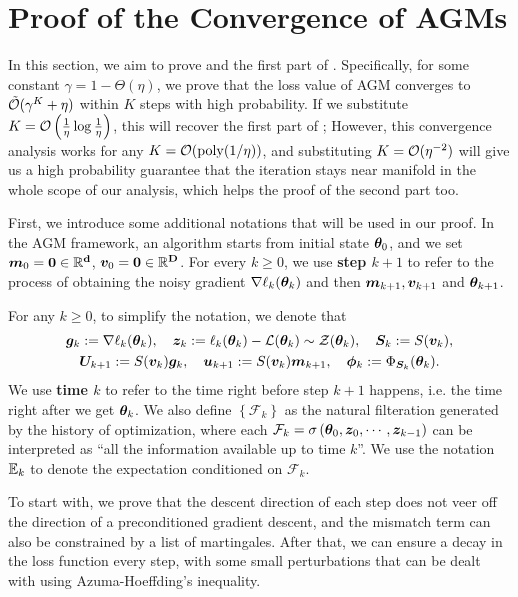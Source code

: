 
\section{Proof of the Convergence of AGMs}\label{app:proof-convergence}


In this section, we aim to prove  and the first part of . Specifically, for some constant $\gamma = 1 - \Theta(\eta)$, we prove that the loss value of AGM converges to $\tilde{\mathcal{O}}(\gamma^K + \eta)$ within $K$ steps with high probability. If we substitute $K = \mathcal{O}\left(\frac{1}{\eta}\log \frac{1}{\eta}\right)$, this will recover the first part of ; However, this convergence analysis works for any $K = \mathcal{O}(\mathrm{poly}(1/\eta))$, and substituting $K = \mathcal{O}(\eta^{-2})$ will give us a high probability guarantee that the iteration stays near manifold in the whole scope of our analysis, which helps the proof of the second part too.

First, we introduce some additional notations that will be used in our proof. In the AGM framework, an algorithm starts from initial state ${\bm{\theta}}_0$, and we set ${\bm{m}}_0 = \bf{0} \in \mathbb{R}^d$, ${\bm{v}}_0 = \bf{0} \in \mathbb{R}^D$. For every $k \geq 0$, we use \textbf{step $k+1$} to refer to the process of obtaining the noisy gradient $\nabla \ell_k({\bm{\theta}}_{k})$ and then ${\bm{m}}_{k+1}, {\bm{v}}_{k+1}$ and ${\bm{\theta}}_{k+1}$. 

For any $k \geq 0$, to simplify the notation, we denote that
\begin{gather*}
    {\bm{g}}_{k} := \nabla \ell_k({\bm{\theta}}_{k}), \quad
    {\bm{z}}_{k} := \ell_k({\bm{\theta}}_{k}) - \mathcal{L}({\bm{\theta}}_k) \sim \mathcal{Z}({\bm{\theta}}_k), \quad {\bm{S}}_k :=S({\bm{v}}_{k}),\\
    {\bm{U}}_{k+1} := S({\bm{v}}_{k}) {\bm{g}}_{k}, \quad
    {\bm{u}}_{k+1} := S({\bm{v}}_{k}) {\bm{m}}_{k+1},\quad {\bm{\phi}}_k:= \Phi_{{\bm{S}}_k}({\bm{\theta}}_k).
\end{gather*} 
We use \textbf{time $k$} to refer to the time right before step $k + 1$ happens, i.e. the time right after we get ${\bm{\theta}}_k$. We also define $\left\{\mathcal{F}_k\right\}$ as the natural filteration generated by the history of optimization, where each $\mathcal{F}_k = \sigma\left({\bm{\theta}}_0, {\bm{z}}_0, \cdots, {\bm{z}}_{k-1}\right)$ can be interpreted as ``all the information available up to time $k$''. We use the notation \textbf{$\mathbb{E}_k$} to denote the expectation conditioned on $\mathcal{F}_k$. 

To start with, we prove that the descent direction of each step does not veer off the direction of a preconditioned gradient descent, and the mismatch term can also be constrained by a list of martingales. After that, we can ensure a decay in the loss function every step, with some small perturbations that can be dealt with using Azuma-Hoeffding's inequality.

